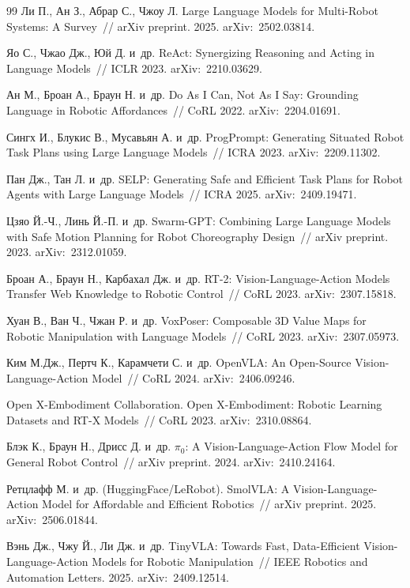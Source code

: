 \documentclass[14pt,a4paper]{extreport}
\begin{document}
\begin{thebibliography}{99}
Ли П., Ан З., Абрар С., Чжоу Л. Large Language Models for Multi-Robot Systems: A Survey~// arXiv preprint. 2025. arXiv:~2502.03814.

Яо С., Чжао Дж., Юй Д. и~др. ReAct: Synergizing Reasoning and Acting in Language Models~// ICLR 2023. arXiv:~2210.03629.

Ан М., Броан А., Браун Н. и~др. Do As I Can, Not As I Say: Grounding Language in Robotic Affordances~// CoRL 2022. arXiv:~2204.01691.

Сингх И., Блукис В., Мусавьян А. и~др. ProgPrompt: Generating Situated Robot Task Plans using Large Language Models~// ICRA 2023. arXiv:~2209.11302.

Пан Дж., Тан Л. и~др. SELP: Generating Safe and Efficient Task Plans for Robot Agents with Large Language Models~// ICRA 2025. arXiv:~2409.19471.

Цзяо Й.-Ч., Линь Й.-П. и~др. Swarm-GPT: Combining Large Language Models with Safe Motion Planning for Robot Choreography Design~// arXiv preprint. 2023. arXiv:~2312.01059.

Броан А., Браун Н., Карбахал Дж. и~др. RT-2: Vision-Language-Action Models Transfer Web Knowledge to Robotic Control~// CoRL 2023. arXiv:~2307.15818.

Хуан В., Ван Ч., Чжан Р. и~др. VoxPoser: Composable 3D Value Maps for Robotic Manipulation with Language Models~// CoRL 2023. arXiv:~2307.05973.

Ким М.Дж., Пертч К., Карамчети С. и~др. OpenVLA: An Open-Source Vision-Language-Action Model~// CoRL 2024. arXiv:~2406.09246.

Open X-Embodiment Collaboration. Open X-Embodiment: Robotic Learning Datasets and RT-X Models~// CoRL 2023. arXiv:~2310.08864.

Блэк К., Браун Н., Дрисс Д. и~др. $\pi_0$: A Vision-Language-Action Flow Model for General Robot Control~// arXiv preprint. 2024. arXiv:~2410.24164.

Ретцлафф М. и~др. (HuggingFace/LeRobot). SmolVLA: A Vision-Language-Action Model for Affordable and Efficient Robotics~// arXiv preprint. 2025. arXiv:~2506.01844.

Вэнь Дж., Чжу Й., Ли Дж. и~др. TinyVLA: Towards Fast, Data-Efficient Vision-Language-Action Models for Robotic Manipulation~// IEEE Robotics and Automation Letters. 2025. arXiv:~2409.12514.


\end{thebibliography}
\end{document}
